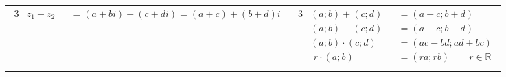 \begin{tabular}{c|c}
    \parbox{0.45\textwidth}
    {
        \begin{alignat*}{3}
            &z_1 + z_2 &&= (a + bi) + (c + di) = (a + c) + (b + d)i \\
        \end{alignat*}
    }
    &
    \parbox{0.45\textwidth}
    {
        \begin{alignat*}{3}
            &\left(a; b\right) + \left(c; d\right) &&= \left(a + c; b + d\right) \\
            &\left(a; b\right) - \left(c; d\right) &&= \left(a - c; b - d\right) \\
            &\left(a; b\right) \cdot \left(c; d\right) &&= \left(ac - bd; ad + bc\right) \\
            &\,\,r \cdot \left(a; b\right) &&= \left(ra; rb\right) \qquad r \in \mathbb{R} \\
        \end{alignat*}
    }
\end{tabular}